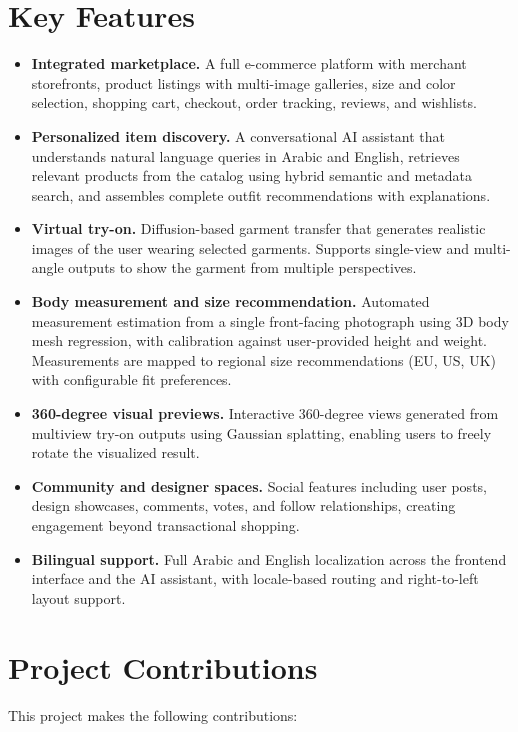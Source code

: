 \section{Key Features}
\begin{itemize}[leftmargin=*]
    \item \textbf{Integrated marketplace.} A full e-commerce platform with merchant storefronts, product listings with multi-image galleries, size and color selection, shopping cart, checkout, order tracking, reviews, and wishlists.

    \item \textbf{Personalized item discovery.} A conversational AI assistant that understands natural language queries in Arabic and English, retrieves relevant products from the catalog using hybrid semantic and metadata search, and assembles complete outfit recommendations with explanations.

    \item \textbf{Virtual try-on.} Diffusion-based garment transfer that generates realistic images of the user wearing selected garments. Supports single-view and multi-angle outputs to show the garment from multiple perspectives.

    \item \textbf{Body measurement and size recommendation.} Automated measurement estimation from a single front-facing photograph using 3D body mesh regression, with calibration against user-provided height and weight. Measurements are mapped to regional size recommendations (EU, US, UK) with configurable fit preferences.

    \item \textbf{360-degree visual previews.} Interactive 360-degree views generated from multiview try-on outputs using Gaussian splatting, enabling users to freely rotate the visualized result.

    \item \textbf{Community and designer spaces.} Social features including user posts, design showcases, comments, votes, and follow relationships, creating engagement beyond transactional shopping.

    \item \textbf{Bilingual support.} Full Arabic and English localization across the frontend interface and the AI assistant, with locale-based routing and right-to-left layout support.
\end{itemize}

\section{Project Contributions}
This project makes the following contributions:

